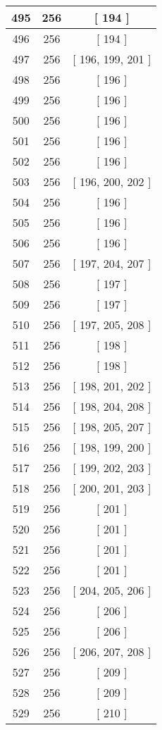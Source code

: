 \begin{center}
\begin{longtable}[H]{|| c c c ||}
\hline
495 & 256 & [ 194 ] \\ 
\hline
496 & 256 & [ 194 ] \\ 
\hline
497 & 256 & [ 196, 199, 201 ] \\ 
\hline
498 & 256 & [ 196 ] \\ 
\hline
499 & 256 & [ 196 ] \\ 
\hline
500 & 256 & [ 196 ] \\ 
\hline
501 & 256 & [ 196 ] \\ 
\hline
502 & 256 & [ 196 ] \\ 
\hline
503 & 256 & [ 196, 200, 202 ] \\ 
\hline
504 & 256 & [ 196 ] \\ 
\hline
505 & 256 & [ 196 ] \\ 
\hline
506 & 256 & [ 196 ] \\ 
\hline
507 & 256 & [ 197, 204, 207 ] \\ 
\hline
508 & 256 & [ 197 ] \\ 
\hline
509 & 256 & [ 197 ] \\ 
\hline
510 & 256 & [ 197, 205, 208 ] \\ 
\hline
511 & 256 & [ 198 ] \\ 
\hline
512 & 256 & [ 198 ] \\ 
\hline
513 & 256 & [ 198, 201, 202 ] \\ 
\hline
514 & 256 & [ 198, 204, 208 ] \\ 
\hline
515 & 256 & [ 198, 205, 207 ] \\ 
\hline
516 & 256 & [ 198, 199, 200 ] \\ 
\hline
517 & 256 & [ 199, 202, 203 ] \\ 
\hline
518 & 256 & [ 200, 201, 203 ] \\ 
\hline
519 & 256 & [ 201 ] \\ 
\hline
520 & 256 & [ 201 ] \\ 
\hline
521 & 256 & [ 201 ] \\ 
\hline
522 & 256 & [ 201 ] \\ 
\hline
523 & 256 & [ 204, 205, 206 ] \\ 
\hline
524 & 256 & [ 206 ] \\ 
\hline
525 & 256 & [ 206 ] \\ 
\hline
526 & 256 & [ 206, 207, 208 ] \\ 
\hline
527 & 256 & [ 209 ] \\ 
\hline
528 & 256 & [ 209 ] \\ 
\hline
529 & 256 & [ 210 ] \\ 

\end{longtable}
\end{center}

